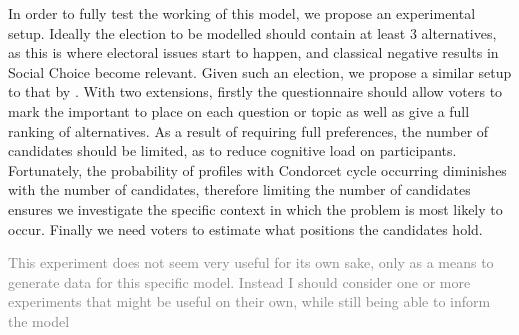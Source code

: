 In order to fully test the working of this model, we propose an experimental
setup. Ideally the election to be modelled should contain at least 3
alternatives, as this is where electoral issues start to happen, and classical
negative results in Social Choice become relevant. Given such an election, we
propose a similar setup to that by \citet{fishkinCanDeliberationHave2024}. With
two extensions, firstly the questionnaire should allow voters to mark the
important to place on each question or topic as well as give a full ranking of
alternatives. As a result of requiring full preferences, the number of
candidates should be limited, as to reduce cognitive load on participants.
Fortunately, the probability of profiles with Condorcet cycle occurring
diminishes with the number of candidates, therefore limiting the number of
candidates ensures we investigate the specific context in which the problem is
most likely to occur. Finally we need voters to estimate what positions the candidates hold.

\textcolor{gray}{This experiment does not seem very useful for its own sake, only as a means to generate data for this specific model. Instead I should consider one or more experiments that might be useful on their own, while still being able to inform the model}
